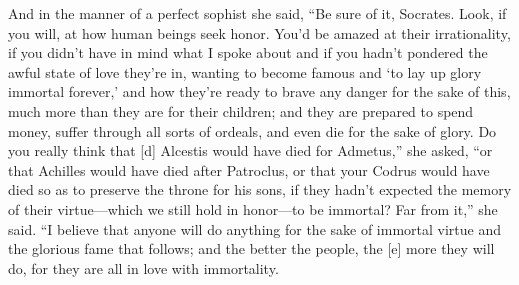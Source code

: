 And in the manner of a perfect sophist she said, “Be sure of it,
Socrates. Look, if you will, at how human beings seek honor. You'd be
amazed at their irrationality, if you didn't have in mind what I spoke
about and if you hadn't pondered the awful state of love they're in,
wanting to become famous and ‘to lay up glory immortal forever,' and how
they're ready to brave any danger for the sake of this, much more than
they are for their children; and they are prepared to spend money,
suffer through all sorts of ordeals, and even die for the sake of glory.
Do you really think that {[}d{]} Alcestis would have died for Admetus,”
she asked, “or that Achilles would have died after Patroclus, or that
your Codrus would have died so as to preserve the throne for his
sons, if they hadn't
expected the memory of their virtue---which we still hold in honor---to
be immortal? Far from it,” she said. “I believe that anyone will do
anything for the sake of immortal virtue and the glorious fame that
follows; and the better the people, the {[}e{]} more they will do, for
they are all in love with immortality.

